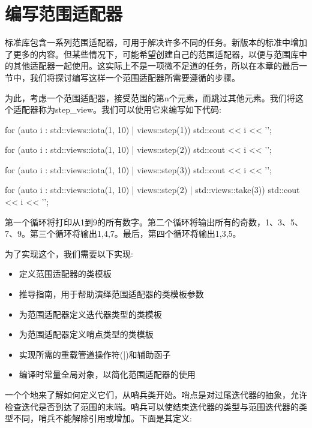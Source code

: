 \section{编写范围适配器}
标准库包含一系列范围适配器，可用于解决许多不同的任务。新版本的标准中增加了更多的内容。但某些情况下，可能希望创建自己的范围适配器，以便与范围库中的其他适配器一起使用。这实际上不是一项微不足道的任务，所以在本章的最后一节中，我们将探讨编写这样一个范围适配器所需要遵循的步骤。

为此，考虑一个范围适配器，接受范围的第n个元素，而跳过其他元素。我们将这个适配器称为step\_view。我们可以使用它来编写如下代码:

\begin{cpp}
for (auto i : std::views::iota(1, 10) | views::step(1))
	std::cout << i << '\n';

for (auto i : std::views::iota(1, 10) | views::step(2))
	std::cout << i << '\n';

for (auto i : std::views::iota(1, 10) | views::step(3))
	std::cout << i << '\n';

for (auto i : std::views::iota(1, 10) | views::step(2) | 	
				std::views::take(3))
	std::cout << i << '\n';
\end{cpp}

第一个循环将打印从1到9的所有数字。第二个循环将输出所有的奇数，1、3、5、7、9。第三个循环将输出1,4,7。最后，第四个循环将输出1,3,5。

为了实现这个，我们需要以下实现:

\begin{itemize}
\item
定义范围适配器的类模板

\item
推导指南，用于帮助演绎范围适配器的类模板参数

\item
为范围适配器定义迭代器类型的类模板

\item
为范围适配器定义哨点类型的类模板

\item
实现所需的重载管道操作符(|)和辅助函子

\item
编译时常量全局对象，以简化范围适配器的使用
\end{itemize}

一个个地来了解如何定义它们，从哨兵类开始。哨点是对过尾迭代器的抽象，允许检查迭代是否到达了范围的末端。哨兵可以使结束迭代器的类型与范围迭代器的类型不同，哨兵不能解除引用或增加。下面是其定义:

